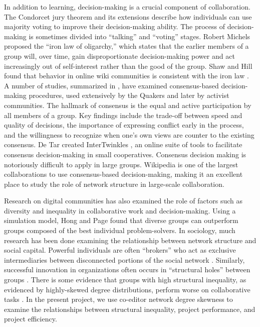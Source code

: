 In addition to learning, decision-making is a crucial component of collaboration.
The Condorcet jury theorem and its extensions \cite{list_epistemic_2001}
describe how individuals can use majority voting to improve their
decision-making ability.
The process of decision-making is sometimes divided into
``talking'' and ``voting'' stages.
Robert Michels proposed the ``iron law of oligarchy,''
\cite{michels_political_1999} which states that
the earlier members of a group will, over time, gain disproportionate
decision-making power and act increasingly out of self-interest rather than
the good of the group.
Shaw and Hill found that behavior in online wiki communities is consistent
with the iron law \cite{shaw_laboratories_2014}.
A number of studies, summarized in \cite{gentry_consensus_1982},
have examined consensus-based decision-making procedures, used extensively by
the Quakers and later by activist communities.
The hallmark of consensus is the equal and active participation by all members
of a group.
Key findings include the trade-off between speed and quality of decisions,
the importance of expressing conflict early in the process,
and the willingness to recognize when one's own views are counter to the
existing consensus.
De Tar created InterTwinkles \cite{detar_intertwinkles:_2013},
an online suite of tools to facilitate consensus decision-making
in small cooperatives.
Consensus decision making is notoriously difficult to apply in large groups.
Wikipedia is one of the largest collaborations to use consensus-based
decision-making,
making it an excellent place to study the role of network structure in
large-scale collaboration.

Research on digital communities has also examined the role of factors
such as diversity and inequality
in collaborative work and decision-making.
Using a simulation model, Hong and Page \cite{hong_groups_2004} found that
diverse groups can outperform groups composed of the best individual
problem-solvers.
In sociology, much research has been done examining the relationship between
network structure and social capital.
Powerful individuals are often ``brokers''
who act as exclusive intermediaries between disconnected portions of the
social network \mbox{\cite{silverman_patronage_1965}}.
Similarly, successful innovation in organizations often occurs in ``structural
holes'' between groups \mbox{\cite{granovetter_strength_1973}}.
There is some evidence that groups with high structural inequality,
as evidenced by highly-skewed degree distributions,
perform worse on collaborative tasks \mbox{\cite{kearns_experiments_2012}}.
In the present project, we use co-editor network degree skewness to
examine the relationships between structural inequality,
project performance, and project efficiency.

